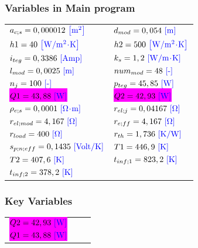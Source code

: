 \documentclass[10pt,fleqn]{article}
\newcommand{\V}[1]{\mbox{$ #1 $}}
\begin{document}
\subsubsection*{Variables in Main program}
\vspace{-0.18 in}
\setlength\LTleft{0pt}
\setlength\LTright{0pt}
\begin{longtable}{ll}
${a_{c;s} =0,000012 \rm\ {\color{blue} \left[m^{2}\right]}}$ & 
${d_{mod} =0,054 \rm\ {\color{blue} \left[m\right]}}$ \\
${\V{h1}  =40 \rm\ {\color{blue} \left[W/m^{2} \! \cdot \!K\right]}}$ & 
${\V{h2}  =500 \rm\ {\color{blue} \left[W/m^{2} \! \cdot \!K\right]}}$ \\
${i_{teg} =0,3386 \rm\ {\color{blue} \left[Amp\right]}}$ & 
${k_{s} =1,2 \rm\ {\color{blue} \left[W/m \! \cdot \!K\right]}}$ \\
${l_{mod} =0,0025 \rm\ {\color{blue} \left[m\right]}}$ & 
${\V{num} _{mod} =48 \rm\ {\color{blue} \left[ \mbox{-} \right]}}$ \\
${n_{j} =100 \rm\ {\color{blue} \left[ \mbox{-} \right]}}$ & 
${p_{teg} =45,85 \rm\ {\color{blue} \left[W\right]}}$ \\
\colorbox{fuchsia}{${\V{Q1}  =43,88 \rm\ {\color{blue} \left[W\right]}}$} & 
\colorbox{fuchsia}{${\V{Q2}  =42,93 \rm\ {\color{blue} \left[W\right]}}$} \\
${\rho_{e;s} =0,0001 \rm\ {\color{blue} \left[\Omega \! \cdot \!m\right]}}$ & 
${r_{el;j} =0,04167 \rm\ {\color{blue} \left[\Omega\right]}}$ \\
${r_{el;mod} =4,167 \rm\ {\color{blue} \left[\Omega\right]}}$ & 
${r_{e;ff} =4,167 \rm\ {\color{blue} \left[\Omega\right]}}$ \\
${r_{load} =400 \rm\ {\color{blue} \left[\Omega\right]}}$ & 
${r_{th} =1,736 \rm\ {\color{blue} \left[K/W\right]}}$ \\
${s_{p;n;eff} =0,1435 \rm\ {\color{blue} \left[Volt/K\right]}}$ & 
${\V{T1}  =446,9 \rm\ {\color{blue} \left[K\right]}}$ \\
${\V{T2}  =407,6 \rm\ {\color{blue} \left[K\right]}}$ & 
${t_{inf;1} =823,2 \rm\ {\color{blue} \left[K\right]}}$ \\
${t_{inf;2} =378,2 \rm\ {\color{blue} \left[K\right]}}$\end{longtable}
\subsubsection*{Key Variables}
\vspace{-0.18 in}
\setlength\LTleft{0pt}
\setlength\LTright{0pt}
\begin{longtable}{lp{12cm}r}
\colorbox{fuchsia}{${\V{Q2}  =42,93 \rm\ {\color{blue} \left[W\right]}}$} & 
\it \textcolor{brown}{} \\
\colorbox{fuchsia}{${\V{Q1}  =43,88 \rm\ {\color{blue} \left[W\right]}}$} & 
\it \textcolor{brown}{} \\
\end{longtable}
\end{document}
